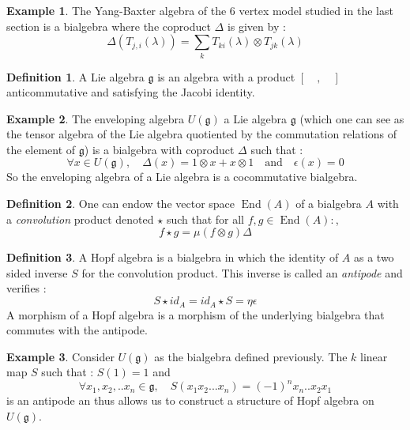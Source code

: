 \documentclass{article}
\DeclareMathOperator{\End}{End}
\theoremstyle{definition}
\newtheorem{ex}{Example}[section]
\newtheorem{Def}{Definition}[section]
\begin{document}
\begin{ex} The Yang-Baxter algebra of the 6 vertex model studied in the last section is a bialgebra where the coproduct $\Delta$ is given by : $$\Delta(T_{j,i}(\lambda))=\sum_{k}T_{ki}(\lambda)\otimes T_{jk}(\lambda)$$
\end{ex}
\begin{Def} A Lie algebra $\mathfrak{g}$ is an algebra with a product $[\quad,\quad]$ anticommutative and satisfying the Jacobi identity.
\end{Def}
\begin{ex} The enveloping algebra $U(\mathfrak{g})$  a Lie algebra $\mathfrak{g}$ (which one can see as the tensor algebra of the Lie algebra quotiented by the commutation relations of the element of $\mathfrak{g}$) is a bialgebra with coproduct $\Delta$ such that : $$\forall x\in U(\mathfrak{g}),\quad\Delta(x)=1\otimes x+ x\otimes 1\quad\mbox{and}\quad \epsilon(x)=0$$
So the enveloping algebra of a Lie algebra is a cocommutative bialgebra.
\end{ex}
\begin{Def} One can endow the vector space $\End(A)$ of a bialgebra $A$ with a \textit{convolution} product denoted $\star$ such that for all $f,g\in\End(A):$, $$f\star g=\mu(f\otimes g)\Delta $$
\end{Def}
\begin{Def} A Hopf algebra is a bialgebra in which the identity of $A$ as a two sided inverse $S$ for the convolution product. This inverse is called an \textit{antipode} and verifies : $$S\star id_A= id_A\star S=\eta\epsilon$$
A morphism of a Hopf algebra is a morphism of the underlying bialgebra that commutes with the antipode.
\end{Def}
\begin{ex}
Consider $U(\mathfrak{g})$ as the bialgebra defined previously. The $k$ linear map $S$ such that : $S(1)=1$ and $$\forall x_1,x_2,..x_n\in\mathfrak{g},\quad S(x_1x_2...x_n)=(-1)^nx_n..x_2x_1$$ is an antipode an thus allows us to construct a structure of Hopf algebra on $U(\mathfrak{g})$.
\end{ex}
\end{document}
